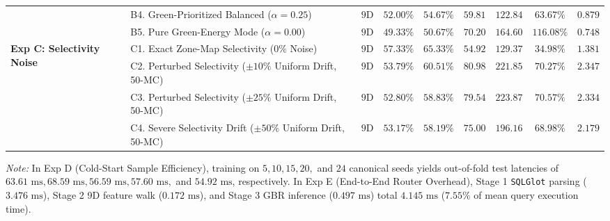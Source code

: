 \documentclass[10pt,a4paper]{article}
\begin{document}
\begin{table}[t!]
{\begin{tabular}{@{}llccccccc@{}}
 & B4. Green-Prioritized Balanced ($\alpha = 0.25$) & $9\text{D}$ & $52.00\%$ & $54.67\%$ & $59.81$ & $\mathbf{122.84}$ & $63.67\%$ & $0.879$ \\
 & B5. Pure Green-Energy Mode ($\alpha = 0.00$) & $9\text{D}$ & $49.33\%$ & $50.67\%$ & $70.20$ & $164.60$ & $116.08\%$ & $\mathbf{0.748}$ \\
\midrule
\multirow{4}{*}{\textbf{Exp C: Selectivity Noise}}
 & C1. Exact Zone-Map Selectivity ($0\%$ Noise) & $9\text{D}$ & $\mathbf{57.33\%}$ & $\mathbf{65.33\%}$ & $\mathbf{54.92}$ & $129.37$ & $\mathbf{34.98\%}$ & $1.381$ \\
 & C2. Perturbed Selectivity ($\pm 10\%$ Uniform Drift, 50-MC) & $9\text{D}$ & $53.79\%$ & $60.51\%$ & $80.98$ & $221.85$ & $70.27\%$ & $2.347$ \\
 & C3. Perturbed Selectivity ($\pm 25\%$ Uniform Drift, 50-MC) & $9\text{D}$ & $52.80\%$ & $58.83\%$ & $79.54$ & $223.87$ & $70.57\%$ & $2.334$ \\
 & C4. Severe Selectivity Drift ($\pm 50\%$ Uniform Drift, 50-MC) & $9\text{D}$ & $53.17\%$ & $58.19\%$ & $75.00$ & $196.16$ & $68.98\%$ & $2.179$ \\
\bottomrule
\end{tabular}%
}
\vspace{2pt}
\parbox{\textwidth}{\scriptsize \textit{Note:} In Exp D (Cold-Start Sample Efficiency), training on $5, 10, 15, 20,$ and $24$ canonical seeds yields out-of-fold test latencies of $63.61\text{ ms}, 68.59\text{ ms}, 56.59\text{ ms}, 57.60\text{ ms},$ and $54.92\text{ ms}$, respectively. In Exp E (End-to-End Router Overhead), Stage 1 \texttt{SQLGlot} parsing ($3.476\text{ ms}$), Stage 2 9D feature walk ($0.172\text{ ms}$), and Stage 3 GBR inference ($0.497\text{ ms}$) total $4.145\text{ ms}$ ($7.55\%$ of mean query execution time).}
\end{table}
\end{document}
